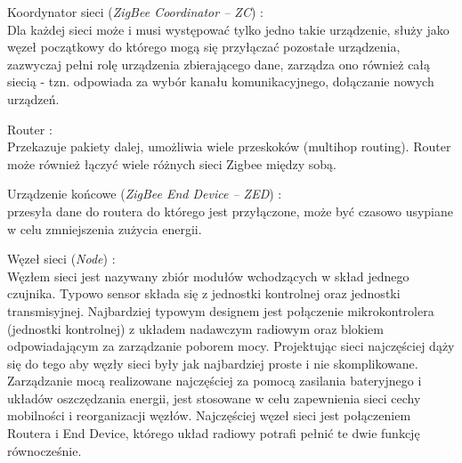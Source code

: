 \par Koordynator sieci (\textit{ZigBee Coordinator – ZC}) : \\
\tab  Dla każdej sieci może i musi występować tylko jedno takie urządzenie, służy jako węzeł początkowy do którego mogą się przyłączać pozostałe urządzenia, zazwyczaj pełni rolę urządzenia zbierającego dane, zarządza ono również całą siecią - tzn. odpowiada za wybór kanału komunikacyjnego, dołączanie nowych urządzeń.
\\
\par Router : \\
\tab Przekazuje pakiety dalej, umożliwia wiele przeskoków (multihop routing). Router może również łączyć wiele różnych sieci Zigbee między sobą.
\\
\par Urządzenie końcowe (\textit{ZigBee End Device – ZED}) : \\
\tab przesyła dane do routera do którego jest przyłączone, może być czasowo usypiane w celu zmniejszenia zużycia energii.
\\
\par Węzeł sieci (\textit{Node}) : \\
\tab Węzłem sieci jest nazywany zbiór modułów wchodzących w skład jednego czujnika. Typowo sensor składa się z jednostki kontrolnej oraz jednostki transmisyjnej. Najbardziej typowym designem jest połączenie mikrokontrolera (jednostki kontrolnej) z układem nadawczym radiowym oraz blokiem odpowiadającym za zarządzanie poborem mocy. Projektując sieci najczęściej dąży się do tego aby węzły sieci były jak najbardziej proste i nie skomplikowane. Zarządzanie mocą realizowane najczęściej za pomocą zasilania bateryjnego i układów oszczędzania energii, jest stosowane w celu zapewnienia sieci cechy mobilności i reorganizacji węzłów.
Najczęściej węzeł sieci jest połączeniem Routera i End Device, którego układ radiowy potrafi pełnić te dwie funkcję równocześnie.

\clearpage